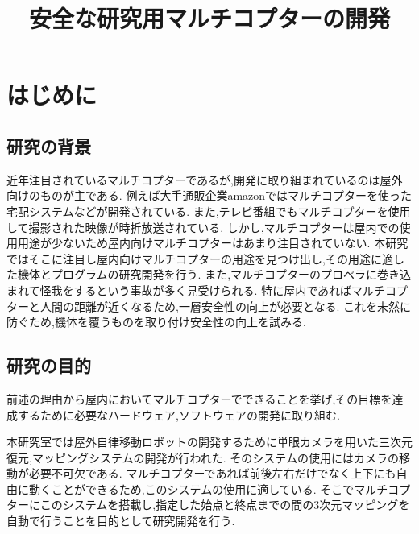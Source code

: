 \documentclass[a4paper]{jarticle}
\begin{document}
\title{安全な研究用マルチコプターの開発}

\maketitle
\section{はじめに}

\subsection{研究の背景}
近年注目されているマルチコプターであるが,開発に取り組まれているのは屋外向けのものが主である.
例えば大手通販企業amazonではマルチコプターを使った宅配システムなどが開発されている.
また,テレビ番組でもマルチコプターを使用して撮影された映像が時折放送されている.
しかし,マルチコプターは屋内での使用用途が少ないため屋内向けマルチコプターはあまり注目されていない.
本研究ではそこに注目し屋内向けマルチコプターの用途を見つけ出し,その用途に適した機体とプログラムの研究開発を行う.
また,マルチコプターのプロペラに巻き込まれて怪我をするという事故が多く見受けられる.
特に屋内であればマルチコプターと人間の距離が近くなるため,一層安全性の向上が必要となる.
これを未然に防ぐため,機体を覆うものを取り付け安全性の向上を試みる.

\subsection{研究の目的}
前述の理由から屋内においてマルチコプターでできることを挙げ,その目標を達成するために必要なハードウェア,ソフトウェアの開発に取り組む.

本研究室では屋外自律移動ロボットの開発するために単眼カメラを用いた三次元復元,マッピングシステムの開発が行われた.
そのシステムの使用にはカメラの移動が必要不可欠である.
マルチコプターであれば前後左右だけでなく上下にも自由に動くことができるため,このシステムの使用に適している.
そこでマルチコプターにこのシステムを搭載し,指定した始点と終点までの間の3次元マッピングを自動で行うことを目的として研究開発を行う.
\end{document}
